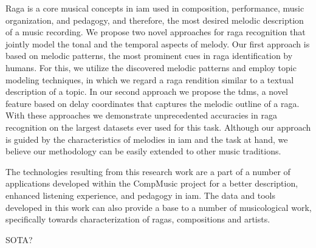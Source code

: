 Raga is a core musical concepts in \gls{iam} used in composition, performance, music organization, and pedagogy, and therefore, the most desired melodic description of a music recording. We propose two novel approaches for raga recognition that jointly model the tonal and the temporal aspects of melody. Our first approach is based on melodic patterns, the most prominent cues in raga identification by humans. For this, we utilize the discovered melodic patterns and employ topic modeling techniques, in which we regard a \gls{raga} rendition similar to a textual description of a topic. In our second approach we propose the \gls{tdms}, a novel feature based on delay coordinates that captures the melodic outline of a \gls{raga}. With these approaches we demonstrate unprecedented accuracies in \gls{raga} recognition on the largest datasets ever used for this task.  Although our approach is guided by the characteristics of melodies in \gls{iam} and the task at hand, we believe our methodology can be easily extended to other music traditions.
	
The technologies resulting from this research work are a part of a number of applications developed within the CompMusic project for a better description, enhanced listening experience, and pedagogy in \gls{iam}. The data and tools developed in this work can also provide a base to a number of musicological work, specifically towards characterization of ragas, compositions and artists. 


SOTA?

